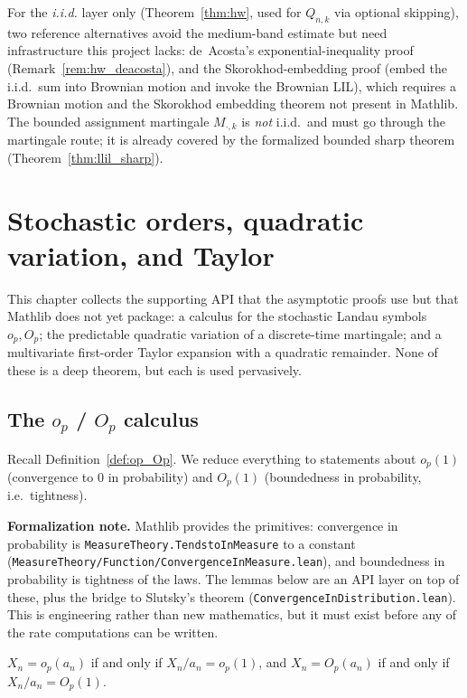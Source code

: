 For the \emph{i.i.d.} layer only (Theorem~\ref{thm:hw}, used for $Q_{n,k}$ via optional skipping),
two reference alternatives avoid the medium-band estimate but need infrastructure this project
lacks: de~Acosta's exponential-inequality proof \cite{deAcosta1983}
(Remark~\ref{rem:hw_deacosta}), and the Skorokhod-embedding proof
\cite{Steele2001} (embed the i.i.d.\ sum into Brownian motion and invoke the Brownian LIL), which
requires a Brownian motion and the Skorokhod embedding theorem not present in Mathlib. The
bounded assignment martingale $M_{\cdot,k}$ is \emph{not} i.i.d.\ and must go through the martingale
route; it is already covered by the formalized bounded sharp theorem
(Theorem~\ref{thm:llil_sharp}).


\chapter{Stochastic orders, quadratic variation, and Taylor}
\label{chap:pre_orders}

This chapter collects the supporting API that the asymptotic proofs use but that
Mathlib does not yet package: a calculus for the stochastic Landau symbols
$o_p, O_p$; the predictable quadratic variation of a discrete-time martingale;
and a multivariate first-order Taylor expansion with a quadratic remainder. None
of these is a deep theorem, but each is used pervasively.

\section{The \texorpdfstring{$o_p$}{op} / \texorpdfstring{$O_p$}{Op} calculus}
\label{sec:pre_op}

Recall Definition~\ref{def:op_Op}. We reduce everything to statements about
$o_p(1)$ (convergence to $0$ in probability) and $O_p(1)$ (boundedness in
probability, i.e.\ tightness).

\textbf{Formalization note.} Mathlib provides the primitives: convergence in
probability is \texttt{MeasureTheory.TendstoInMeasure} to a constant
(\texttt{MeasureTheory/Function/ConvergenceInMeasure.lean}), and boundedness in
probability is tightness of the laws. The lemmas below are an API layer on top of
these, plus the bridge to Slutsky's theorem
(\texttt{ConvergenceInDistribution.lean}). This is engineering rather than new
mathematics, but it must exist before any of the rate computations can be
written.

\begin{lemma}\label{lem:op_factor}
$X_n = o_p(a_n)$ if and only if $X_n/a_n = o_p(1)$, and $X_n = O_p(a_n)$ if and
only if $X_n/a_n = O_p(1)$.
\end{lemma}

